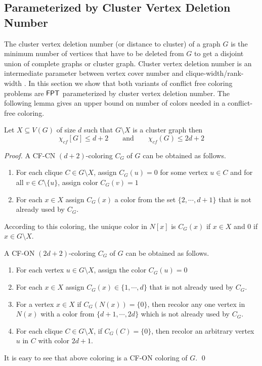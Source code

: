 \documentclass[svgnames]{llncs}
\newcommand{\fpt}{\ensuremath{\sf{FPT}}\xspace}
\newcommand{\cfcn}{\textsc {CF-CN}}
\newcommand{\cfon}{\textsc {CF-ON}}
\begin{document}
\subsection{Parameterized by Cluster Vertex Deletion Number}
The cluster vertex deletion number (or distance to cluster) of a graph $G$ is the minimum number of vertices
that have to be deleted from $G$ to get a disjoint union of complete graphs or
cluster graph. Cluster vertex deletion number is
an intermediate parameter between vertex cover number and clique-width/rank-width \cite{doucha2012cluster}.
In this section we show that both variants of conflict free coloring problems are $\fpt$ parameterized by cluster vertex deletion number. The following lemma gives an upper bound on number of colors needed in a conflict-free coloring.
\begin{lemma}\label{lem-bound}
Let $X \subseteq V(G)$ of size $d$ such that $G \setminus X$ is a cluster graph then
$$\chi_{cf}[G] \leq d+2 \qquad \textrm {and} \qquad \chi_{cf}(G) \leq 2d+2$$
\end{lemma}
\begin{proof}
A \cfcn{} $(d+2)$-coloring $C_G$ of $G$ can be obtained as follows.
\begin{enumerate}
\item For each clique $C \in G \setminus X$, assign $C_G(u)=0$ for some vertex $u \in C$ and  for all 
$v \in C \setminus \{u\}$, assign color $C_G(v)=1$
\item For each $x \in X$ assign $C_G(x)$ a color from the set $\{2, \cdots, d+1\}$ that is not already used by $C_G$.
\end{enumerate}
According to this coloring, the unique color in $N[x]$ is $C_G(x)$ if $x \in X$ and $0$ if $x \in G \setminus X$.

A \cfon{} $(2d+2)$-coloring $C_G$ of $G$ can be obtained as follows.
\begin{enumerate}
\item For each vertex $u \in G \setminus X$, assign the color $C_G(u)=0$ 
\item For each $x \in X$ assign $C_G(x) \in \{1, \cdots, d\}$ that is not already used by $C_G$.
\item For a vertex $x \in X$ if $C_G(N(x))= \{0\}$, then recolor any one vertex in $N(x)$ with a color from $\{d+1, \cdots ,2d\}$ which is not already used by $C_G$.

\item For each clique $C \in G \setminus X$, if $C_G(C)=\{0\}$, then recolor an arbitrary vertex $u$ in $C$ with color $2d+1$.
\end{enumerate}
It is easy to see that above coloring is a \cfon{} coloring of $G$. \qed
\end{proof}
\end{document}

